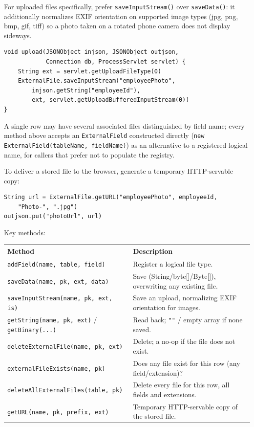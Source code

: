 \noindent
For uploaded files specifically, prefer \texttt{saveInputStream()} over \texttt{saveData()}: it additionally normalizes EXIF orientation on supported image types (jpg, png, bmp, gif, tiff) so a photo taken on a rotated phone camera does not display sideways.

\begin{lstlisting}[style=groovy]
void upload(JSONObject injson, JSONObject outjson,
            Connection db, ProcessServlet servlet) {
    String ext = servlet.getUploadFileType(0)
    ExternalFile.saveInputStream("employeePhoto",
        injson.getString("employeeId"),
        ext, servlet.getUploadBufferedInputStream(0))
}
\end{lstlisting}

\noindent
A single row may have several associated files distinguished by field name; every method above accepts an \texttt{ExternalField} constructed directly (\texttt{new ExternalField(tableName, fieldName)}) as an alternative to a registered logical name, for callers that prefer not to populate the registry.

\noindent
To deliver a stored file to the browser, generate a temporary HTTP-servable copy:

\begin{lstlisting}[style=groovy]
String url = ExternalFile.getURL("employeePhoto", employeeId,
    "Photo-", ".jpg")
outjson.put("photoUrl", url)
\end{lstlisting}

\noindent
Key methods:

\begin{longtable}{P{5.2cm}P{5.3cm}}
\toprule
\textbf{Method} & \textbf{Description} \\
\midrule
\endhead
\texttt{addField(name, table, field)} & Register a logical file type. \\
\texttt{saveData(name, pk, ext, data)} & Save (String/byte[]/Byte[]), overwriting any existing file. \\
\texttt{saveInputStream(name, pk, ext, is)} & Save an upload, normalizing EXIF orientation for images. \\
\texttt{getString(name, pk, ext)} / \texttt{getBinary(...)} & Read back; \texttt{""} / empty array if none saved. \\
\texttt{deleteExternalFile(name, pk, ext)} & Delete; a no-op if the file does not exist. \\
\texttt{externalFileExists(name, pk)} & Does any file exist for this row (any field/extension)? \\
\texttt{deleteAllExternalFiles(\allowbreak table, pk)} & Delete every file for this row, all fields and extensions. \\
\texttt{getURL(name, pk, prefix, ext)} & Temporary HTTP-servable copy of the stored file. \\
\bottomrule
\end{longtable}

